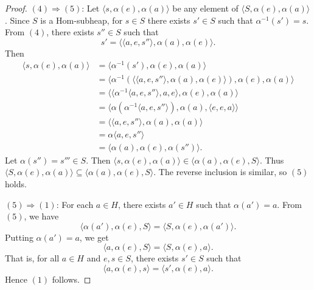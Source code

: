 \documentclass[10pt,a4paper]{amsart}
\begin{document}
\begin{proof}
\vspace{0.3em}
$(4) \Rightarrow (5)$:  
Let $\langle s, \alpha(e), \alpha(a) \rangle$ be any element of $\langle S, \alpha(e), \alpha(a) \rangle$.  
Since $S$ is a Hom-subheap, for $s \in S$ there exists $s' \in S$ such that $\alpha^{-1}(s') = s$.  
From $(4)$, there exists $s'' \in S$ such that
\[
s' = \langle \langle a, e, s'' \rangle, \alpha(a), \alpha(e) \rangle.
\]
Then
\begin{align*}
\langle s, \alpha(e), \alpha(a) \rangle
&= \langle \alpha^{-1}(s'), \alpha(e), \alpha(a) \rangle \\
&= \langle \alpha^{-1}(\langle \langle a, e, s'' \rangle, \alpha(a), \alpha(e) \rangle), \alpha(e), \alpha(a) \rangle \\
&= \langle \langle \alpha^{-1} \langle a, e, s'' \rangle, a, e \rangle, \alpha(e), \alpha(a) \rangle \\
&= \langle \alpha(\alpha^{-1} \langle a, e, s'' \rangle), \alpha(a), \langle e, e, a \rangle \rangle \\
&= \langle \langle a, e, s'' \rangle, \alpha(a), \alpha(a) \rangle \\
&= \alpha \langle a, e, s'' \rangle \\
&= \langle \alpha(a),\alpha(e), \alpha(s'') \rangle.
\end{align*}
Let $\alpha(s'') = s''' \in S$. Then $\langle s, \alpha(e), \alpha(a) \rangle \in \langle \alpha(a), \alpha(e), S \rangle$.  
Thus $\langle S, \alpha(e), \alpha(a) \rangle \subseteq \langle \alpha(a), \alpha(e), S \rangle$.  
The reverse inclusion is similar, so $(5)$ holds.

\vspace{0.3em}
$(5) \Rightarrow (1)$:  
For each $a \in H$, there exists $a' \in H$ such that $\alpha(a') = a$.  
From $(5)$, we have
\[
\langle \alpha(a'), \alpha(e), S \rangle = \langle S, \alpha(e), \alpha(a') \rangle.
\]
Putting $\alpha(a') = a$, we get
\[
\langle a, \alpha(e), S \rangle = \langle S, \alpha(e), a \rangle.
\]
That is, for all $a \in H$ and $e, s \in S$, there exists $s' \in S$ such that
\[
\langle a, \alpha(e), s \rangle = \langle s', \alpha(e), a \rangle.
\]
Hence $(1)$ follows.
\end{proof}
\end{document}
